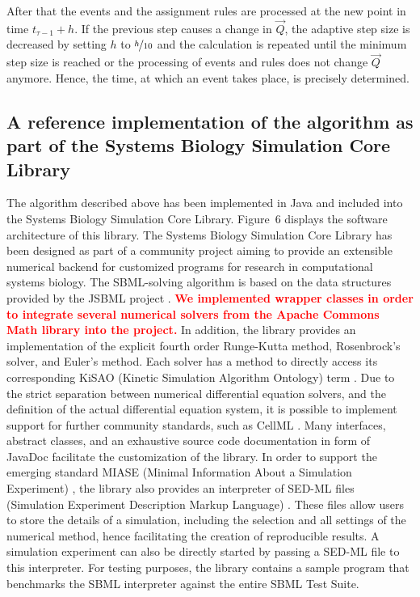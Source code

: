 \documentclass[10pt]{bmc_article}
\newenvironment{bmcformat}{\baselineskip20pt\sloppy\setboolean{publ}{false}}{\baselineskip20pt\sloppy}
\newcommand{\TODO}[1]{\textcolor{red}{\textbf{#1}}}
\begin{document}
\begin{bmcformat}
After that the events and the assignment rules are processed at the new point in time $t_{\tau - 1} + h$.
If the previous step causes a change in $\vec{Q}$, the adaptive step size is decreased by setting $h$ to $\nicefrac{h}{10}$ and
the calculation is repeated until the minimum step size is reached or the processing of events and rules does not change $\vec{Q}$ anymore.
Hence, the time, at which an event takes place, is precisely determined.

\subsection*{A reference implementation of the algorithm as part of the Systems Biology Simulation Core Library}

The algorithm described above has been implemented in Java\texttrademark{} and included into the Systems Biology Simulation Core Library.
Figure~6 displays the software architecture of this library.
The Systems Biology Simulation Core Library has been designed as part of a community project aiming to provide an extensible numerical backend for customized programs for research in computational systems biology.
The SBML-solving algorithm is based on the data structures provided by the JSBML project \cite{Draeger2008}.
\TODO{We implemented wrapper classes in order to integrate several numerical solvers from the Apache Commons Math library into the project.}
In addition, the library provides an implementation of the explicit fourth order Runge-Kutta method, Rosenbrock's solver, and Euler's method.
Each solver has a method to directly access its corresponding KiSAO (Kinetic Simulation Algorithm Ontology) term \cite{Courtot2011}.
Due to the strict separation between numerical differential equation solvers, and the definition of the actual differential equation system, it is possible to implement support for further community standards, such as CellML \cite{Lloyd2004}.
Many interfaces, abstract classes, and an exhaustive source code documentation in form of JavaDoc facilitate the customization of the library.
In order to support the emerging standard MIASE (Minimal Information About a Simulation Experiment) \cite{Waltemath2011a}, the library also provides an interpreter of SED-ML files (Simulation Experiment Description Markup Language) \cite{Waltemath2011}.
These files allow users to store the details of a simulation, including the selection and all settings of the numerical method, hence facilitating the creation of reproducible results.
A simulation experiment can also be directly started by passing a SED-ML file to this interpreter.
For testing purposes, the library contains a sample program that benchmarks the SBML interpreter against the entire SBML Test Suite.



\end{bmcformat}
\end{document}
